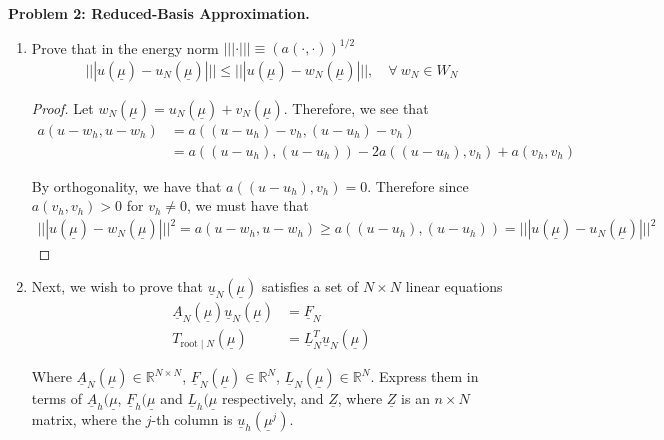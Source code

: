 \textbf{Problem 2: Reduced-Basis Approximation.}

\begin{enumerate}[label=(\alph*),leftmargin=*,itemsep=0mm]
    
    \item Prove that in the energy norm $|||\cdot||| \equiv (a(\cdot,\cdot))^{1/2}$
    \begin{align*}
        |||u(\underline{\mu}) - u_N(\underline{\mu})||| 
        \leq |||u(\underline{\mu}) - w_N(\underline{\mu})|||,\quad\forall\>w_N\in W_N
    \end{align*}
    
    \begin{proof}
        Let $w_N(\underline{\mu}) = u_N(\underline{\mu}) + v_N(\underline{\mu})$.  Therefore, we see that
        \begin{align*}
            a(u-w_h,u-w_h) &= a((u-u_h)-v_h,(u-u_h)-v_h) \\
            &= a((u-u_h),(u-u_h)) - 2a((u-u_h),v_h) + a(v_h,v_h)
        \end{align*}
        
        By orthogonality, we have that $a((u-u_h),v_h) = 0$.  Therefore since $a(v_h,v_h)>0$ for $v_h \neq 0$, we must have that
        \begin{align*}
            |||u(\underline{\mu}) - w_N(\underline{\mu})|||^2
            = a(u-w_h,u-w_h) \geq a((u-u_h),(u-u_h))
            = |||u(\underline{\mu}) - u_N(\underline{\mu})|||^2
        \end{align*}
    \end{proof}
    
    \item Next, we wish to prove that $\underline{u}_N(\underline{\mu})$ satisfies a set of $N\times N$ linear equations
    \begin{align*}
        \underline{A}_N(\underline{\mu}) \underline{u}_N(\underline{\mu}) &= \underline{F}_N \\
        T_{\text{root}\mid N}(\underline{\mu}) &= \underline{L}_N^T \underline{u}_N(\underline{\mu})
    \end{align*}
    
    Where $\underline{A}_N(\underline{\mu}) \in \mathbb{R}^{N\times N}$, $\underline{F}_N(\underline{\mu}) \in \mathbb{R}^{N}$, $\underline{L}_N(\underline{\mu}) \in \mathbb{R}^{N}$.  Express them in terms of $\underline{A}_h(\underline{\mu}$, $\underline{F}_h(\underline{\mu}$ and $\underline{L}_h(\underline{\mu}$ respectively, and $\underline{Z}$, where $\underline{Z}$ is an $n\times N$ matrix, where the $j$-th column is $\underline{u}_h(\underline{\mu}^j)$.
    

\end{enumerate}
